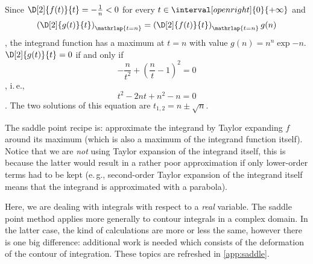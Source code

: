 \documentclass[onecolumn,a4paper,11pt]{article}
\newenvironment{approfondimento}%
  {\begin{quoting}\small\ignorespaces}%
  {\end{quoting}}
\providecommand{\ie}{i.\,e.}
\providecommand{\eg}{e.\,g.}
\theoremstyle{classicdef}
\theoremstyle{remark}
\begin{document}
Since $\D[2]{f(t)}{t} = -\frac{1}{n}<0$ for every $t\in\interval[open
right]{0}{+\infty}$ and 
\begin{dmath*}
   \left( \D[2]{g(t)}{t} \right)_{\mathrlap{t=n}} = \left( \D[2]{f(t)}{t}
   \right)_{\mathrlap{t=n}}
   g(n) 
\end{dmath*},
the integrand function 
 has a maximum at $t=n$ with value $g(n) = n^{n}
\exp{-n}$.
$\D[2]{g(t)}{t}=0$ if and only if 
\begin{dmath*}
- \frac{n}{t^{2}} + \left(  \frac{n}{t} - 1 \right)^{2} = 0 
\end{dmath*},
\ie,
\begin{dmath*}
t^{2} -2n t + n^{2} - n = 0 
\end{dmath*}.
The two solutions of this equation  are $ t_{1,2} = n \pm \sqrt{n}$.

The saddle point recipe is:
approximate the integrand by Taylor expanding 
$f$ around  its maximum (which is also a maximum
of the integrand function itself).
Notice that we are \emph{not}  using Taylor expansion of the integrand itself, this is
because the latter  would
result  in a rather poor approximation if only lower-order terms had to be 
kept (\eg, second-order Taylor expansion of the integrand itself means that the
integrand is approximated with a parabola).

\begin{approfondimento}
Here, we are dealing with integrals with respect to a \emph{real}
variable. The saddle point method applies more generally to contour integrals in
 a complex domain. In the latter case, the kind of calculations are more or less
the same, however there is one big difference: additional work is needed which
consists of the deformation of the contour of integration. These topics are
refreshed in \cref{app:saddle}.
\end{approfondimento}
\end{document}
